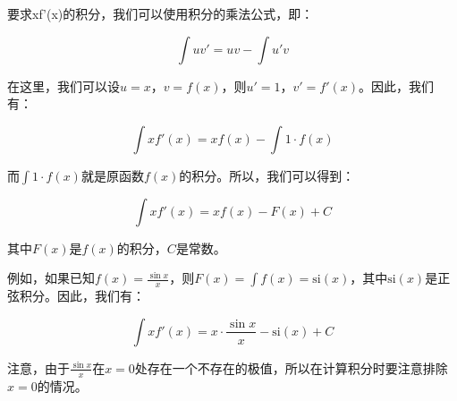 要求xf'(x)的积分，我们可以使用积分的乘法公式，即：

$$ \int uv' = uv - \int u'v $$

在这里，我们可以设$u = x$，$v = f(x)$，则$u' = 1$，$v' = f'(x)$。因此，我们有：

$$ \int xf'(x) = xf(x) - \int 1 \cdot f(x) $$

而$\int 1 \cdot f(x)$就是原函数$f(x)$的积分。所以，我们可以得到：

$$ \int xf'(x) = xf(x) - F(x) + C $$

其中$F(x)$是$f(x)$的积分，$C$是常数。

例如，如果已知$f(x) = \frac{\sin x}{x}$，则$F(x) = \int f(x) = \text{si}(x)$，其中$\text{si}(x)$是正弦积分。因此，我们有：

$$ \int xf'(x) = x \cdot \frac{\sin x}{x} - \text{si}(x) + C $$

注意，由于$\frac{\sin x}{x}$在$x=0$处存在一个不存在的极值，所以在计算积分时要注意排除$x=0$的情况。